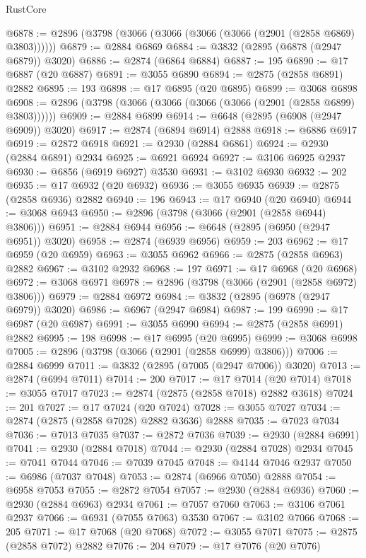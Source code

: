 \begin{lexlean}{RustCore}
\begin{coremodule}
@6878 := @2896 (@3798 (@3066 (@3066 (@3066 (@3066 (@2901 (@2858 @6869) @3803))))))
@6879 := @2884 @6869
@6884 := @3832 (@2895 (@6878 (@2947 @6879)) @3020)
@6886 := @2874 (@6864 @6884)
@6887 := 195
@6890 := @17 @6887 (@20 @6887)
@6891 := @3055 @6890
@6894 := @2875 (@2858 @6891) @2882
@6895 := 193
@6898 := @17 @6895 (@20 @6895)
@6899 := @3068 @6898
@6908 := @2896 (@3798 (@3066 (@3066 (@3066 (@3066 (@2901 (@2858 @6899) @3803))))))
@6909 := @2884 @6899
@6914 := @6648 (@2895 (@6908 (@2947 @6909)) @3020)
@6917 := @2874 (@6894 @6914) @2888
@6918 := @6886 @6917
@6919 := @2872 @6918
@6921 := @2930 (@2884 @6861)
@6924 := @2930 (@2884 @6891) @2934
@6925 := @6921 @6924
@6927 := @3106 @6925 @2937
@6930 := @6856 (@6919 @6927) @3530
@6931 := @3102 @6930
@6932 := 202
@6935 := @17 @6932 (@20 @6932)
@6936 := @3055 @6935
@6939 := @2875 (@2858 @6936) @2882
@6940 := 196
@6943 := @17 @6940 (@20 @6940)
@6944 := @3068 @6943
@6950 := @2896 (@3798 (@3066 (@2901 (@2858 @6944) @3806)))
@6951 := @2884 @6944
@6956 := @6648 (@2895 (@6950 (@2947 @6951)) @3020)
@6958 := @2874 (@6939 @6956)
@6959 := 203
@6962 := @17 @6959 (@20 @6959)
@6963 := @3055 @6962
@6966 := @2875 (@2858 @6963) @2882
@6967 := @3102 @2932
@6968 := 197
@6971 := @17 @6968 (@20 @6968)
@6972 := @3068 @6971
@6978 := @2896 (@3798 (@3066 (@2901 (@2858 @6972) @3806)))
@6979 := @2884 @6972
@6984 := @3832 (@2895 (@6978 (@2947 @6979)) @3020)
@6986 := @6967 (@2947 @6984)
@6987 := 199
@6990 := @17 @6987 (@20 @6987)
@6991 := @3055 @6990
@6994 := @2875 (@2858 @6991) @2882
@6995 := 198
@6998 := @17 @6995 (@20 @6995)
@6999 := @3068 @6998
@7005 := @2896 (@3798 (@3066 (@2901 (@2858 @6999) @3806)))
@7006 := @2884 @6999
@7011 := @3832 (@2895 (@7005 (@2947 @7006)) @3020)
@7013 := @2874 (@6994 @7011)
@7014 := 200
@7017 := @17 @7014 (@20 @7014)
@7018 := @3055 @7017
@7023 := @2874 (@2875 (@2858 @7018) @2882 @3618)
@7024 := 201
@7027 := @17 @7024 (@20 @7024)
@7028 := @3055 @7027
@7034 := @2874 (@2875 (@2858 @7028) @2882 @3636) @2888
@7035 := @7023 @7034
@7036 := @7013 @7035
@7037 := @2872 @7036
@7039 := @2930 (@2884 @6991)
@7041 := @2930 (@2884 @7018)
@7044 := @2930 (@2884 @7028) @2934
@7045 := @7041 @7044
@7046 := @7039 @7045
@7048 := @4144 @7046 @2937
@7050 := @6986 (@7037 @7048)
@7053 := @2874 (@6966 @7050) @2888
@7054 := @6958 @7053
@7055 := @2872 @7054
@7057 := @2930 (@2884 @6936)
@7060 := @2930 (@2884 @6963) @2934
@7061 := @7057 @7060
@7063 := @3106 @7061 @2937
@7066 := @6931 (@7055 @7063) @3530
@7067 := @3102 @7066
@7068 := 205
@7071 := @17 @7068 (@20 @7068)
@7072 := @3055 @7071
@7075 := @2875 (@2858 @7072) @2882
@7076 := 204
@7079 := @17 @7076 (@20 @7076)

\end{coremodule}
\end{lexlean}
